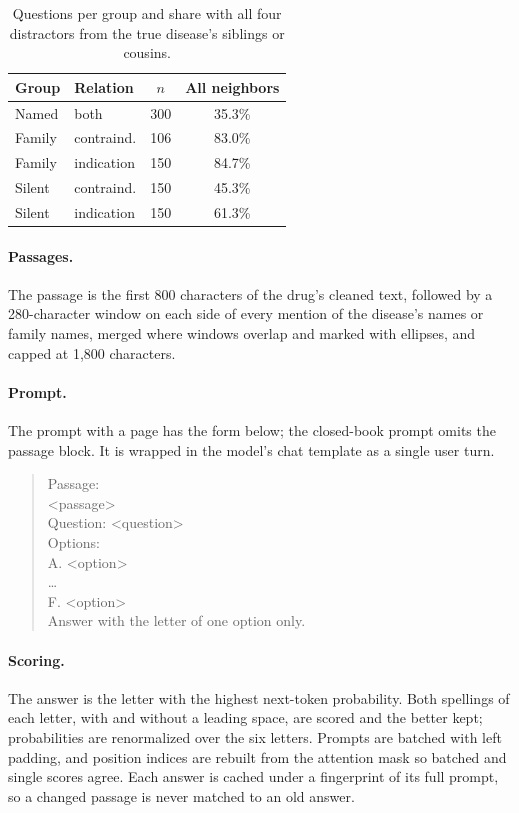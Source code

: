 \documentclass[letterpaper]{article} %
\begin{document}
\begin{table}[h]
\centering
\small
\begin{tabular}{llcc}
\toprule
Group & Relation & $n$ & All neighbors \\
\midrule
Named & both & 300 & 35.3\% \\
Family & contraind. & 106 & 83.0\% \\
Family & indication & 150 & 84.7\% \\
Silent & contraind. & 150 & 45.3\% \\
Silent & indication & 150 & 61.3\% \\
\bottomrule
\end{tabular}
\caption{Questions per group and share with all four distractors from the
true disease's siblings or cousins.}
\label{tab:sib}
\end{table}

\paragraph{Passages.}
The passage is the first 800 characters of the drug's cleaned text, followed by
a 280-character window on each side of every mention of the disease's names or
family names, merged where windows overlap and marked with ellipses, and
capped at 1,800 characters.

\paragraph{Prompt.}
The prompt with a page has the form below; the closed-book prompt omits the
passage block. It is wrapped in the model's chat template as a single user
turn.

\begin{quote}
\small\ttfamily
Passage:\\
<passage>\\[2pt]
Question: <question>\\
Options:\\
A. <option>\\
\ldots\\
F. <option>\\
Answer with the letter of one option only.
\end{quote}

\paragraph{Scoring.}
The answer is the letter with the highest next-token probability. Both
spellings of each letter, with and without a leading space, are scored and
the better kept; probabilities are renormalized over the six letters. Prompts
are batched with left padding, and position indices are rebuilt from the
attention mask so batched and single scores agree. Each answer is cached under
a fingerprint of its full prompt, so a changed passage is never matched to an
old answer.
\end{document}
